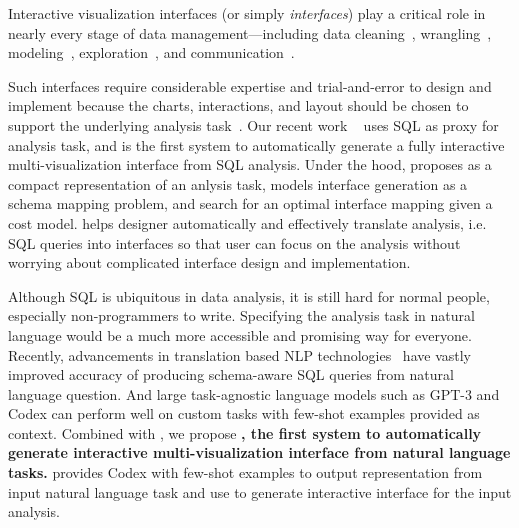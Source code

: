 Interactive visualization interfaces (or simply {\it interfaces}) play a critical role in nearly every stage of data management---including data cleaning~\cite{wu2013scorpion}, wrangling~\cite{Kandel2011WranglerIV}, modeling~\cite{facets}, exploration~\cite{Murray2013TableauYD, Chen2021TSExplainSE}, and communication~\cite{icheck,fivethirtyeight}. 

Such interfaces require considerable expertise and trial-and-error to design and implement because the charts, interactions, and layout should be chosen to support the underlying analysis task~\cite{munzner2014visualization}.
Our recent work \sysold~\cite{chen2022pi2,pi2demo} uses SQL as proxy for analysis task, and is the first system to automatically generate  a fully interactive multi-visualization interface from SQL analysis. Under the hood, \sysold proposes \difftrees as a compact representation of an anlysis task, models interface generation as a schema mapping problem, and search for an optimal interface mapping given a cost model. \sysold helps designer automatically and effectively translate analysis, i.e. SQL queries into interfaces so that user can focus on the analysis without worrying about complicated interface design and implementation. 

Although SQL is ubiquitous in data analysis, it is still hard for normal people, especially non-programmers to write.
Specifying the analysis task in natural language would be a much more accessible and promising way for everyone. Recently, advancements in translation based NLP technologies~\cite{scholak2021picard, https://doi.org/10.48550/arxiv.2109.05153} have vastly improved accuracy of producing schema-aware SQL queries from natural language question. And large task-agnostic language models such as GPT-3\cite{brown2020language} and Codex\cite{chen2021evaluating} can perform well on custom tasks with few-shot examples provided as context. Combined with \sysold, we propose \textbf{ \sys, the first system to automatically generate interactive multi-visualization interface from natural language tasks.} \sys provides Codex with few-shot examples to output \difftree representation from input natural language task and use \sys to generate interactive interface for the input analysis. 

